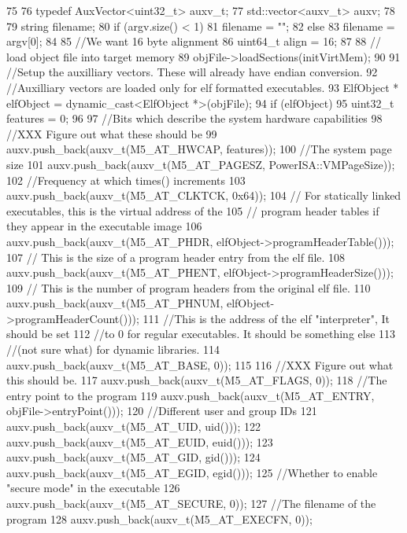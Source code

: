 \begin{DoxyCode}
75 {
76     typedef AuxVector<uint32_t> auxv_t;
77     std::vector<auxv_t> auxv;
78 
79     string filename;
80     if (argv.size() < 1)
81         filename = "";
82     else
83         filename = argv[0];
84 
85     //We want 16 byte alignment
86     uint64_t align = 16;
87 
88     // load object file into target memory
89     objFile->loadSections(initVirtMem);
90 
91     //Setup the auxilliary vectors. These will already have endian conversion.
92     //Auxilliary vectors are loaded only for elf formatted executables.
93     ElfObject * elfObject = dynamic_cast<ElfObject *>(objFile);
94     if (elfObject) {
95         uint32_t features = 0;
96 
97         //Bits which describe the system hardware capabilities
98         //XXX Figure out what these should be
99         auxv.push_back(auxv_t(M5_AT_HWCAP, features));
100         //The system page size
101         auxv.push_back(auxv_t(M5_AT_PAGESZ, PowerISA::VMPageSize));
102         //Frequency at which times() increments
103         auxv.push_back(auxv_t(M5_AT_CLKTCK, 0x64));
104         // For statically linked executables, this is the virtual address of the
105         // program header tables if they appear in the executable image
106         auxv.push_back(auxv_t(M5_AT_PHDR, elfObject->programHeaderTable()));
107         // This is the size of a program header entry from the elf file.
108         auxv.push_back(auxv_t(M5_AT_PHENT, elfObject->programHeaderSize()));
109         // This is the number of program headers from the original elf file.
110         auxv.push_back(auxv_t(M5_AT_PHNUM, elfObject->programHeaderCount()));
111         //This is the address of the elf "interpreter", It should be set
112         //to 0 for regular executables. It should be something else
113         //(not sure what) for dynamic libraries.
114         auxv.push_back(auxv_t(M5_AT_BASE, 0));
115 
116         //XXX Figure out what this should be.
117         auxv.push_back(auxv_t(M5_AT_FLAGS, 0));
118         //The entry point to the program
119         auxv.push_back(auxv_t(M5_AT_ENTRY, objFile->entryPoint()));
120         //Different user and group IDs
121         auxv.push_back(auxv_t(M5_AT_UID, uid()));
122         auxv.push_back(auxv_t(M5_AT_EUID, euid()));
123         auxv.push_back(auxv_t(M5_AT_GID, gid()));
124         auxv.push_back(auxv_t(M5_AT_EGID, egid()));
125         //Whether to enable "secure mode" in the executable
126         auxv.push_back(auxv_t(M5_AT_SECURE, 0));
127         //The filename of the program
128         auxv.push_back(auxv_t(M5_AT_EXECFN, 0));
}}
\end{DoxyCode}
